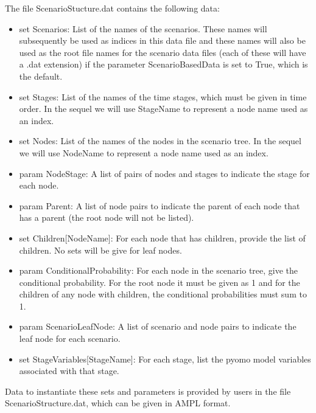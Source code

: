 The file ScenarioStucture.dat contains the following data:

\begin{itemize}
  \item set Scenarios: List of the names of the scenarios. These names will
  subsequently be used as indices in this data file and these names will also be
  used as the root file names for the scenario data files (each of these will
  have a .dat extension) if the parameter ScenarioBasedData is set to True,
  which is the default.

  \item set Stages: List of the names of the time stages, which must be given in
  time order. In the sequel we will use {\sc StageName} to represent a node name
  used as an index.

  \item set Nodes: List of the names of the nodes in the scenario tree. In the
  sequel we will use {\sc NodeName} to represent a node name used as an index.

  \item param NodeStage: A list of pairs of nodes and stages to indicate the
  stage for each node.

  \item param Parent: A list of node pairs to indicate the parent of each node
  that has a parent (the root node will not be listed).

  \item set Children[{\sc NodeName}]: For each node that has children, provide
  the list of children. No sets will be give for leaf nodes.

  \item param ConditionalProbability: For each node in the scenario tree, give
  the conditional probability. For the root node it must be given as 1 and for
  the children of any node with children, the conditional probabilities must sum
  to 1.

  \item param ScenarioLeafNode: A list of scenario and node pairs to indicate
  the leaf node for each scenario.

  \item set StageVariables[{\sc StageName}]: For each stage, list the pyomo
  model variables associated with that stage.
\end{itemize}

Data to instantiate these sets and parameters is provided by users in the file
ScenarioStructure.dat, which can be given in AMPL \cite{ampl} format.


